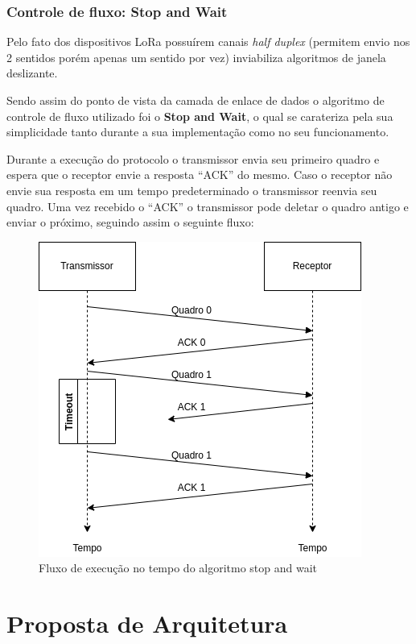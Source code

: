 \documentclass[
article,			%
12pt,				%
oneside,			%
a4paper,			%
english,			%
brazil,				%
sumario=tradicional
]{abntex2}
\begin{document}
\subsubsection{Controle de fluxo: Stop and Wait}\label{Stop and Wait}
Pelo fato dos dispositivos LoRa possuírem canais \textit{half duplex} (permitem envio nos 2 sentidos porém apenas um sentido por vez) inviabiliza algoritmos de janela deslizante.

Sendo assim do ponto de vista da camada de enlace de dados o algoritmo de controle de fluxo utilizado foi o \textbf{Stop and Wait}, o qual se carateriza pela sua simplicidade tanto durante a sua implementação como no seu funcionamento.

Durante a execução do protocolo o transmissor envia seu primeiro quadro e espera que o receptor envie a resposta ``ACK'' do mesmo. Caso o receptor não envie sua resposta em um tempo predeterminado o transmissor reenvia seu quadro. Uma vez recebido o ``ACK'' o transmissor pode deletar o quadro antigo e enviar o próximo, seguindo assim o seguinte fluxo:

\begin{figure}[!htb]
    \centering
    \includegraphics[width=.8\textwidth]{stop_and_wait}
    \caption{\label{fig:stop_and_wait}Fluxo de execução no tempo do algoritmo stop and wait}
\end{figure}

\section{Proposta de Arquitetura}\label{Proposta de Arquitetura}
\end{document}
